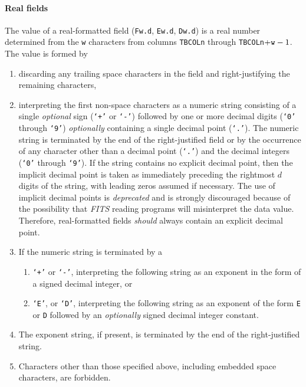 \documentclass[11pt,makeidx]{book}     %
\begin{document}
   \paragraph{Real fields} The value of a real-formatted field ({\tt F}{\tt w.d\/}, 
   {\tt E}{\tt w.d\/}, {\tt D}{\tt w.d\/}) is a real number determined
   from the {\tt w}  characters from columns {\tt TBCOL}{\tt n\/} through 
   {\tt TBCOL}{\tt n}$ + {\tt w} - 1$.  The value is formed by 
   \begin{enumerate}
       \item discarding any trailing space characters in the field and right-justifying
         the remaining characters,
       \item interpreting the first non-space characters as a numeric
           string consisting of a single {\em optional} sign ({\tt `+'} or
           {\tt `-'}) followed by one or more decimal digits 
           ({\tt `0'} through {\tt `9'}) {\em optionally} containing 
           a single decimal point ({\tt `.'}).  The numeric string 
           is terminated by the end of the right-justified field or 
           by the occurrence of any character other than a decimal 
           point ({\tt `.'}) and the decimal integers ({\tt `0'} 
           through {\tt `9'}).  If
           the string contains no explicit decimal point, then the
           implicit decimal point is taken as immediately preceding 
           the rightmost $d$ digits of the string, with 
           leading zeros assumed if necessary.  The use of implicit
	   decimal points is {\em deprecated} 
	   and is strongly discouraged
	   because of the possibility that {\em FITS\/} reading programs will
	   misinterpret the data value.
	   Therefore, real-formatted fields {\em should} always contain an 
	   explicit decimal point.
       \item If the numeric string is terminated by a
        \begin{enumerate}
         \item {\tt `+'} or {\tt `-'}, interpreting the following
               string as an exponent in the form of a signed decimal
               integer, or
         \item {\tt `E'}, or {\tt `D'}, interpreting the following
               string as an exponent of the form {\tt E} or {\tt D}
               followed by an {\em optionally} signed decimal integer
               constant.
        \end{enumerate}
       \item The exponent string, if present, is terminated by 
           the end of the right-justified string.
       \item Characters other than those specified above, including embedded space
       characters, are forbidden.
   \end{enumerate}
\end{document}
